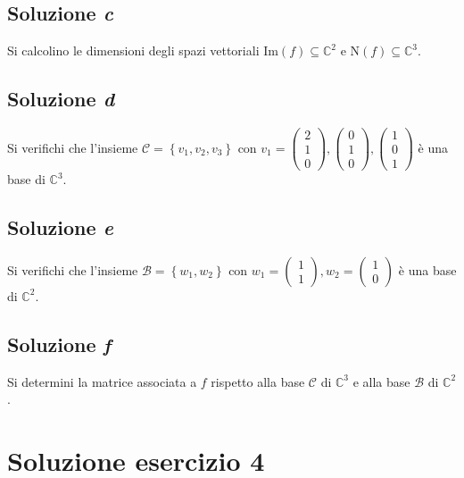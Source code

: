 \documentclass[a4paper]{article}
\begin{document}
	\subsection{Soluzione \emph{c}}
	
	Si calcolino le dimensioni degli spazi vettoriali $\mathrm{Im}\left(f\right) \subseteq \mathbb{C}^{2}$ e $\mathrm{N}\left(f\right) \subseteq \mathbb{C}^{3}$.
	
	\subsection{Soluzione \emph{d}}
	
	Si verifichi che l'insieme $\mathscr{C} = \left\{v_{1}, v_{2}, v_{3}\right\}$ con $v_{1} = \begin{pmatrix}
		2 \\ 1 \\ 0
	\end{pmatrix}, \begin{pmatrix}
		0 \\ 1 \\ 0
	\end{pmatrix}, \begin{pmatrix}
		1 \\ 0 \\ 1
	\end{pmatrix}$ è una base di $\mathbb{C}^{3}$.
	
	\subsection{Soluzione \emph{e}}
	
	Si verifichi che l'insieme $\mathscr{B} = \left\{w_{1}, w_{2}\right\}$ con $w_{1} = \begin{pmatrix}
		1 \\ 1
	\end{pmatrix}, w_{2} = \begin{pmatrix}
		1 \\ 0
	\end{pmatrix}$ è una base di $\mathbb{C}^{2}$.
	
	\subsection{Soluzione \emph{f}}
	
	Si determini la matrice associata a $f$ rispetto alla base $\mathscr{C}$ di $\mathbb{C}^{3}$ e alla base $\mathscr{B}$ di $\mathbb{C}^{2}$.
	
	\section{Soluzione esercizio 4}
	
\end{document}
